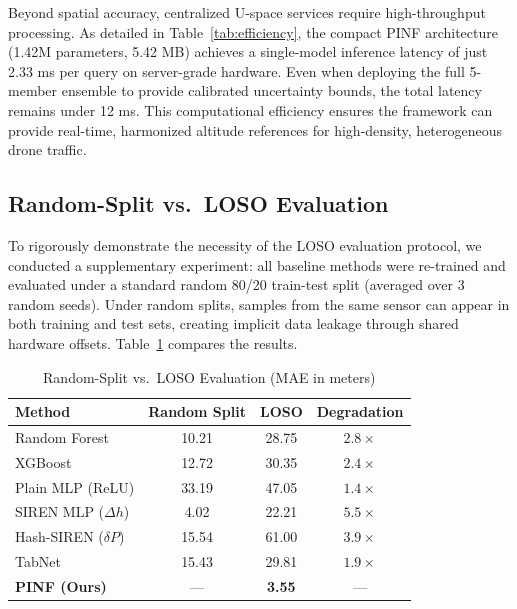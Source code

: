 Beyond spatial accuracy, centralized U-space services require high-throughput processing. As detailed in Table~\ref{tab:efficiency}, the compact PINF architecture (1.42M parameters, 5.42 MB) achieves a single-model inference latency of just 2.33 ms per query on server-grade hardware. Even when deploying the full 5-member ensemble to provide calibrated uncertainty bounds, the total latency remains under 12 ms. This computational efficiency ensures the framework can provide real-time, harmonized altitude references for high-density, heterogeneous drone traffic.


\subsection{Random-Split vs.\ LOSO Evaluation}
\label{subsec:random_vs_loso}

To rigorously demonstrate the necessity of the LOSO evaluation protocol, we conducted a supplementary experiment: all baseline methods were re-trained and evaluated under a standard random 80/20 train-test split (averaged over 3 random seeds). Under random splits, samples from the same sensor can appear in both training and test sets, creating implicit data leakage through shared hardware offsets. Table~\ref{tab:random_vs_loso} compares the results.

\begin{table}[htbp]
\caption{Random-Split vs.\ LOSO Evaluation (MAE in meters)}
\label{tab:random_vs_loso}
\centering
\begin{tabular}{lccc}
\toprule
\textbf{Method} & \textbf{Random Split} & \textbf{LOSO} & \textbf{Degradation} \\
\midrule
Random Forest & 10.21 & 28.75 & $2.8\times$ \\
XGBoost & 12.72 & 30.35 & $2.4\times$ \\
Plain MLP (ReLU) & 33.19 & 47.05 & $1.4\times$ \\
SIREN MLP ($\Delta h$) \cite{sitzmann2020implicit} & 4.02 & 22.21 & $\mathbf{5.5\times}$ \\
Hash-SIREN ($\delta P$) & 15.54 & 61.00 & $\mathbf{3.9\times}$ \\
TabNet \cite{arik2021tabnet} & 15.43 & 29.81 & $1.9\times$ \\
\midrule
\textbf{PINF (Ours)} & --- & \textbf{3.55} & --- \\
\bottomrule
\end{tabular}
\end{table}

